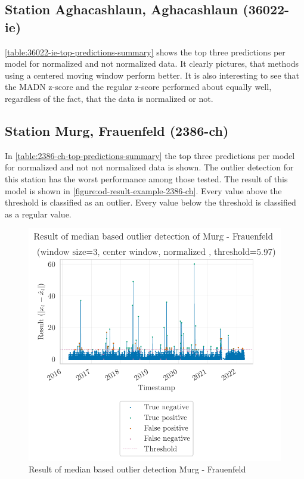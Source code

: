 \subsection{Station Aghacashlaun, Aghacashlaun (36022-ie)}
\autoref{table:36022-ie-top-predictions-summary} shows the top three predictions per model for normalized and not normalized data. It clearly pictures, that methods using a centered moving window perform better. It is also interesting to see that the \ac{MADN} z-score and the regular z-score performed about equally well, regardless of the fact, that the data is normalized or not.


\subsection{Station Murg, Frauenfeld (2386-ch)}
In \autoref{table:2386-ch-top-predictions-summary} the top three predictions per model for normalized and not not normalized data is shown. The outlier detection for this station has the worst performance among those tested. The result of this model is shown in \autoref{figure:od-result-example-2386-ch}. Every value above the threshold is classified as an outlier. Every value below the threshold is classified as a regular value.

\begin{figure}[htp]
    \centering 
    \includegraphics{plots/pdfs/2386-ch/od_result_median_2386-ch_all.pdf}
    \caption{Result of median based outlier detection Murg - Frauenfeld}
    \label{figure:od-result-example-2386-ch}
\end{figure}


